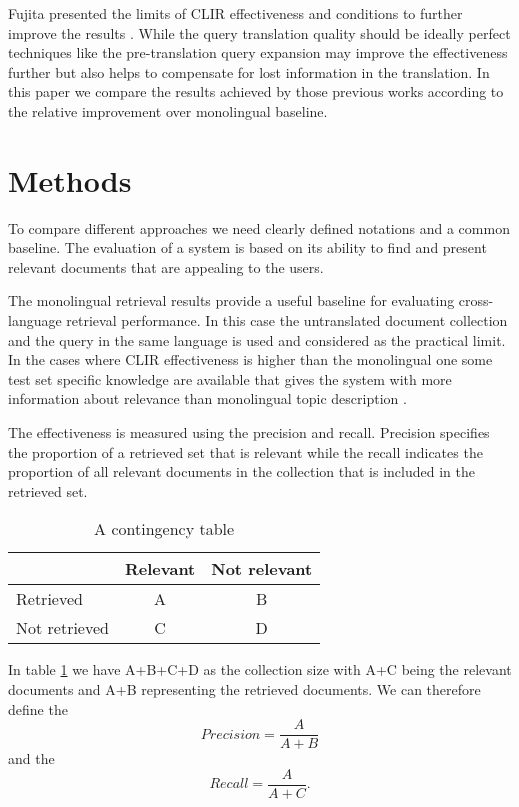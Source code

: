 \documentclass[journal]{IEEEtran}
\begin{document}
Fujita presented the limits of CLIR effectiveness and conditions to further improve the results \cite{fujita01}.
While the query translation quality should be ideally perfect techniques like the pre-translation query expansion may improve the effectiveness further but also helps to compensate for lost information in the translation.
In this paper we compare the results achieved by those previous works according to the relative improvement over monolingual baseline.



\section{Methods}
To compare different approaches we need clearly defined notations and a common baseline.
The evaluation of a system is based on its ability to find and present relevant documents that are appealing to the users.

The monolingual retrieval results provide a useful baseline for evaluating cross-language retrieval performance.
In this case the untranslated document collection and the query in the same language is used and considered as the practical limit.
In the cases where CLIR effectiveness is higher than the monolingual one some test set specific knowledge are available that gives the system with more information about relevance than monolingual topic description \cite{xu00}.

The effectiveness is measured using the precision and recall.
Precision specifies the proportion of a retrieved set that is relevant while the recall indicates the proportion of all relevant documents in the collection that is included in the retrieved set.

\begin{table}[h]
\caption{A contingency table}
\label{contTable}
\begin{center}
\begin{tabular}{ | l | c | c | }
	\hline
				& Relevant	& Not relevant	\\ \hline
	Retrieved		& A		& B			\\ \hline
	Not retrieved	& C		& D			\\
	\hline
\end{tabular}
\end{center}
\end{table}

In table \ref{contTable} we have A+B+C+D as the collection size with A+C being the relevant documents and A+B representing the retrieved documents.
We can therefore define the
\begin{equation}
\label{precision}
Precision = \frac{A}{A+B}
\end{equation}
and the
\begin{equation}
\label{recall}
Recall = \frac{A}{A+C}.
\end{equation}
\end{document}
